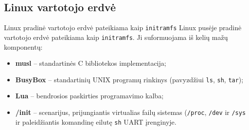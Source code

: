 \subsection{Linux vartotojo erdvė}
\label{sec:linux-userspace}

Linux pradinė vartotojo erdvė pateikiama kaip \texttt{initramfs}
Linux pusėje pradinė vartotojo erdvė pateikiama kaip \texttt{initramfs}. Ji suformuojama iš kelių mažų komponentų:

\begin{itemize}
\item \textbf{musl} -- standartinės C bibliotekos implementacija;
\item \textbf{BusyBox} -- standartinių UNIX programų rinkinys (pavyzdžiui \texttt{ls}, \texttt{sh}, \texttt{tar});
\item \textbf{Lua} -- bendrosios paskirties programavimo kalba;
\item \textbf{/init} -- scenarijus, prijungiantis virtualias failų sistemas (\texttt{/proc}, \texttt{/dev} ir \texttt{/sys} ir paleidžiantis komandinę eilutę \texttt{sh} UART įrenginyje.
\end{itemize}

